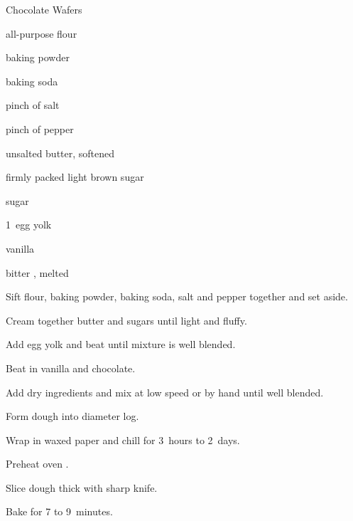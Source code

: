 \begin{recipe}{Chocolate Wafers}{}{}

\begin{ingredients}
\item {} all-purpose flour
\item \tp{\half} baking powder
\item \tp{\quarter} baking soda
\item pinch of salt
\item pinch of pepper
\item \C{\threequarter} unsalted butter, softened
\item \C{\quarter} firmly packed light brown sugar
\item \C{\quarter} sugar
\item 1~egg yolk
\item {} vanilla
\item \C{\eighth} bitter , melted
\end{ingredients}

\begin{directions}
\item Sift flour, baking powder, baking soda, salt and pepper together and set aside.
\item Cream together butter and sugars until light and fluffy.
\item Add egg yolk and beat until mixture is well blended.
\item Beat in vanilla and chocolate.
\item Add dry ingredients and mix at low speed or by hand until well blended.
\item Form dough into  diameter log.
\item Wrap in waxed paper and chill for 3~hours to 2~days.
\item Preheat oven .
\item Slice dough \cm{\quarter} thick with sharp knife.
\item Bake for 7 to 9~minutes.
\end{directions}

\end{recipe}
